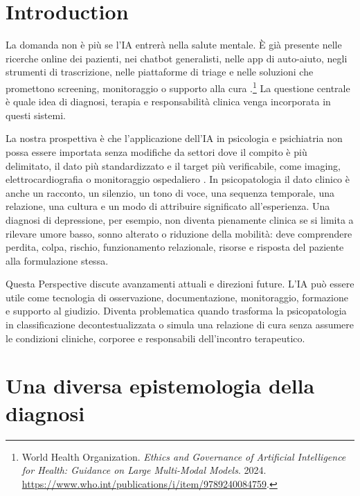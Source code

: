 \documentclass[utf8]{FrontiersinHarvard}
\begin{document}
\section{Introduction}
\label{sec:intro}

La domanda non \`e pi\`u se l'\ac{IA} entrer\`a nella salute mentale. \`E gi\`a presente nelle ricerche online dei pazienti, nei chatbot generalisti, nelle app di auto-aiuto, negli strumenti di trascrizione, nelle piattaforme di triage e nelle soluzioni che promettono screening, monitoraggio o supporto alla cura \citep{guo2024,hua2025}.\footnote{World Health Organization. \emph{Ethics and Governance of Artificial Intelligence for Health: Guidance on Large Multi-Modal Models}. 2024. \url{https://www.who.int/publications/i/item/9789240084759}.} La questione centrale \`e quale idea di diagnosi, terapia e responsabilit\`a clinica venga incorporata in questi sistemi.

La nostra prospettiva \`e che l'applicazione dell'\ac{IA} in psicologia e psichiatria non possa essere importata senza modifiche da settori dove il compito \`e pi\`u delimitato, il dato pi\`u standardizzato e il target pi\`u verificabile, come imaging, elettrocardiografia o monitoraggio ospedaliero \citep{abramoff2018,lang2023,ribeiro2020,yao2021,adams2022}. In psicopatologia il dato clinico \`e anche un racconto, un silenzio, un tono di voce, una sequenza temporale, una relazione, una cultura e un modo di attribuire significato all'esperienza. Una diagnosi di depressione, per esempio, non diventa pienamente clinica se si limita a rilevare umore basso, sonno alterato o riduzione della mobilit\`a: deve comprendere perdita, colpa, rischio, funzionamento relazionale, risorse e risposta del paziente alla formulazione stessa.

Questa Perspective discute avanzamenti attuali e direzioni future. L'\ac{IA} pu\`o essere utile come tecnologia di osservazione, documentazione, monitoraggio, formazione e supporto al giudizio. Diventa problematica quando trasforma la psicopatologia in classificazione decontestualizzata o simula una relazione di cura senza assumere le condizioni cliniche, corporee e responsabili dell'incontro terapeutico.

\section{Una diversa epistemologia della diagnosi}
\label{sec:epistemologia}
\end{document}
